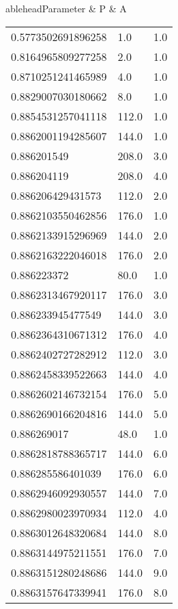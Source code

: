 \begin{center}
\twocolumn
{}
	ablehead{Parameter & P & A \\}
\tabletail{%
}
\tablelasttail{\hline}
\begin{supertabular}[H]{p{0.30\textwidth}p{0.05\textwidth}p{0.05\textwidth}}
0.5773502691896258 & 1.0 & 1.0 \\ 
0.8164965809277258 & 2.0 & 1.0 \\ 
0.8710251241465989 & 4.0 & 1.0 \\ 
0.8829007030180662 & 8.0 & 1.0 \\ 
0.8854531257041118 & 112.0 & 1.0 \\ 
0.8862001194285607 & 144.0 & 1.0 \\ 
0.886201549 & 208.0 & 3.0 \\ 
0.886204119 & 208.0 & 4.0 \\ 
0.886206429431573 & 112.0 & 2.0 \\ 
0.8862103550462856 & 176.0 & 1.0 \\ 
0.8862133915296969 & 144.0 & 2.0 \\ 
0.8862163222046018 & 176.0 & 2.0 \\ 
0.886223372 & 80.0 & 1.0 \\ 
0.8862313467920117 & 176.0 & 3.0 \\ 
0.886233945477549 & 144.0 & 3.0 \\ 
0.8862364310671312 & 176.0 & 4.0 \\ 
0.8862402727282912 & 112.0 & 3.0 \\ 
0.8862458339522663 & 144.0 & 4.0 \\ 
0.8862602146732154 & 176.0 & 5.0 \\ 
0.8862690166204816 & 144.0 & 5.0 \\ 
0.886269017 & 48.0 & 1.0 \\ 
0.8862818788365717 & 144.0 & 6.0 \\ 
0.886285586401039 & 176.0 & 6.0 \\ 
0.8862946092930557 & 144.0 & 7.0 \\ 
0.8862980023970934 & 112.0 & 4.0 \\ 
0.8863012648320684 & 144.0 & 8.0 \\ 
0.8863144975211551 & 176.0 & 7.0 \\ 
0.8863151280248686 & 144.0 & 9.0 \\ 
0.8863157647339941 & 176.0 & 8.0 \\ 

\end{supertabular}
\end{center}
